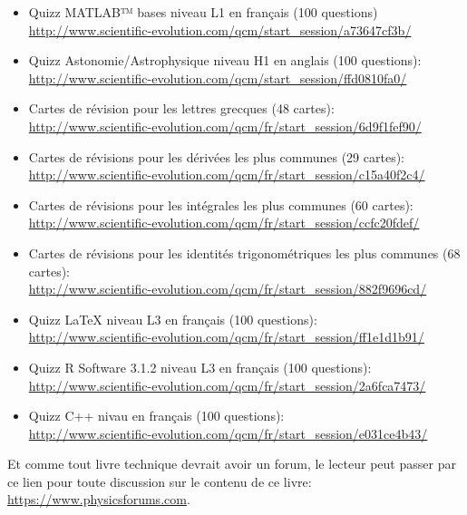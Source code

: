 	 \begin{itemize}
		\item Quizz MATLAB™ bases niveau L1 en français (100 questions)\\ \url{http://www.scientific-evolution.com/qcm/start_session/a73647cf3b/}
		
		\item Quizz Astonomie/Astrophysique niveau H1 en anglais (100 questions):\\ \url{http://www.scientific-evolution.com/qcm/start_session/ffd0810fa0/}
		
		\item Cartes de révision pour les lettres grecques (48 cartes):\\
		\url{http://www.scientific-evolution.com/qcm/fr/start_session/6d9f1fef90/}
		
		\item Cartes de révisions pour les dérivées les plus communes (29 cartes):\\
		\url{http://www.scientific-evolution.com/qcm/fr/start_session/c15a40f2c4/}
		
		\item Cartes de révisions pour les intégrales les plus communes (60 cartes):\\
		\url{http://www.scientific-evolution.com/qcm/fr/start_session/ccfc20fdef/}
		
		\item Cartes de révisions pour les identités trigonométriques les plus communes (68 cartes):\\
		\url{http://www.scientific-evolution.com/qcm/fr/start_session/882f9696cd/}
		
		\item Quizz \LaTeX{} niveau L3 en français (100 questions):\\ \url{http://www.scientific-evolution.com/qcm/fr/start_session/ff1e1d1b91/}
		
		\item Quizz R Software 3.1.2 niveau L3 en français (100 questions):\\ \url{http://www.scientific-evolution.com/qcm/fr/start_session/2a6fca7473/}
		
		\item Quizz C++ nivau en français (100 questions):\\
		\url{http://www.scientific-evolution.com/qcm/fr/start_session/e031ce4b43/}
	\end{itemize}
	Et comme tout livre technique devrait avoir un forum, le lecteur peut passer par ce lien pour toute discussion sur le contenu de ce livre: \url{https://www.physicsforums.com}.
	
